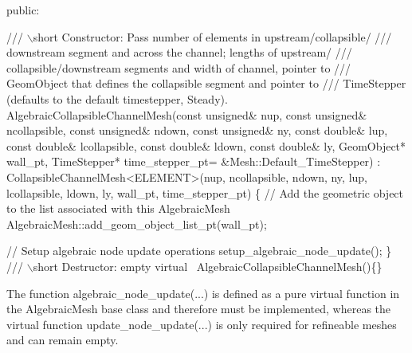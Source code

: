 \begin{DoxyCodeInclude}

\textcolor{keyword}{public}: 

\textcolor{comment}{}
\textcolor{comment}{ /// \(\backslash\)short Constructor: Pass number of elements in upstream/collapsible/}
\textcolor{comment}{ /// downstream segment and across the channel; lengths of upstream/}
\textcolor{comment}{ /// collapsible/downstream segments and width of channel, pointer to }
\textcolor{comment}{ /// GeomObject that defines the collapsible segment and pointer to }
\textcolor{comment}{ /// TimeStepper (defaults to the default timestepper, Steady). }
\textcolor{comment}{} AlgebraicCollapsibleChannelMesh(\textcolor{keyword}{const} \textcolor{keywordtype}{unsigned}& nup, 
                                 \textcolor{keyword}{const} \textcolor{keywordtype}{unsigned}& ncollapsible, 
                                 \textcolor{keyword}{const} \textcolor{keywordtype}{unsigned}& ndown, 
                                 \textcolor{keyword}{const} \textcolor{keywordtype}{unsigned}& ny, 
                                 \textcolor{keyword}{const} \textcolor{keywordtype}{double}& lup, 
                                 \textcolor{keyword}{const} \textcolor{keywordtype}{double}& lcollapsible, 
                                 \textcolor{keyword}{const} \textcolor{keywordtype}{double}& ldown, 
                                 \textcolor{keyword}{const} \textcolor{keywordtype}{double}& ly,
                                 GeomObject* wall\_pt,
                                 TimeStepper* time\_stepper\_pt=
                                 &Mesh::Default\_TimeStepper) :
  CollapsibleChannelMesh<ELEMENT>(nup, ncollapsible, ndown, ny,
                                  lup, lcollapsible, ldown, ly,
                                  wall\_pt,
                                  time\_stepper\_pt)
  \{
   \textcolor{comment}{// Add the geometric object to the list associated with this AlgebraicMesh}
   AlgebraicMesh::add\_geom\_object\_list\_pt(wall\_pt);

   \textcolor{comment}{// Setup algebraic node update operations}
   setup\_algebraic\_node\_update();
  \}
 \textcolor{comment}{}
\textcolor{comment}{ /// \(\backslash\)short Destructor: empty}
\textcolor{comment}{} \textcolor{keyword}{virtual} ~AlgebraicCollapsibleChannelMesh()\{\}

\end{DoxyCodeInclude}


The function {\ttfamily algebraic\+\_\+node\+\_\+update}(...) is defined as a pure virtual function in the {\ttfamily Algebraic\+Mesh} base class and therefore must be implemented, whereas the virtual function {\ttfamily update\+\_\+node\+\_\+update}(...) is only required for refineable meshes and can remain empty.


